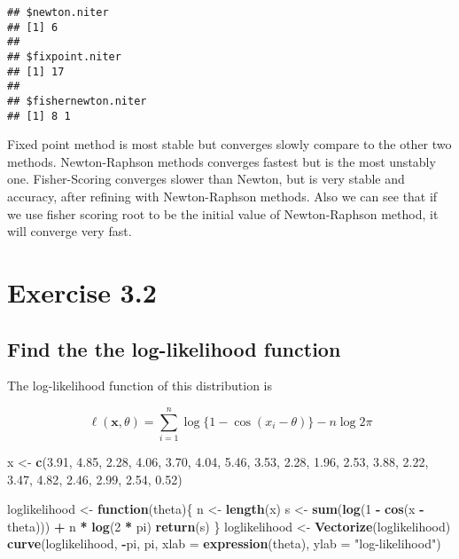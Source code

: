 \documentclass[]{book}
\newenvironment{Shaded}{\begin{snugshade}}{\end{snugshade}}
\newcommand{\KeywordTok}[1]{\textcolor[rgb]{0.13,0.29,0.53}{\textbf{#1}}}
\newcommand{\DataTypeTok}[1]{\textcolor[rgb]{0.13,0.29,0.53}{#1}}
\newcommand{\DecValTok}[1]{\textcolor[rgb]{0.00,0.00,0.81}{#1}}
\newcommand{\FloatTok}[1]{\textcolor[rgb]{0.00,0.00,0.81}{#1}}
\newcommand{\StringTok}[1]{\textcolor[rgb]{0.31,0.60,0.02}{#1}}
\newcommand{\ControlFlowTok}[1]{\textcolor[rgb]{0.13,0.29,0.53}{\textbf{#1}}}
\newcommand{\OperatorTok}[1]{\textcolor[rgb]{0.81,0.36,0.00}{\textbf{#1}}}
\newcommand{\NormalTok}[1]{#1}
\theoremstyle{definition}
\theoremstyle{definition}
\theoremstyle{definition}
\theoremstyle{remark}
\begin{document}
\begin{verbatim}
## $newton.niter
## [1] 6
## 
## $fixpoint.niter
## [1] 17
## 
## $fishernewton.niter
## [1] 8 1
\end{verbatim}

Fixed point method is most stable but converges slowly compare to the
other two methods. Newton-Raphson methods converges fastest but is the
most unstably one. Fisher-Scoring converges slower than Newton, but is
very stable and accuracy, after refining with Newton-Raphson methods.
Also we can see that if we use fisher scoring root to be the initial
value of Newton-Raphson method, it will converge very fast.

\chapter{Exercise 3.2}\label{exercise-3.2}

\section{Find the the log-likelihood
function}\label{find-the-the-log-likelihood-function}

The log-likelihood function of this distribution is

\[ \ell(\mathbf{x}, \theta) = \sum_{i=1}^n \log\{1-\cos(x_i-\theta)\} - n\log2\pi\]

\begin{Shaded}
\begin{Highlighting}[]
\NormalTok{x <-}\StringTok{ }\KeywordTok{c}\NormalTok{(}\FloatTok{3.91}\NormalTok{, }\FloatTok{4.85}\NormalTok{, }\FloatTok{2.28}\NormalTok{, }\FloatTok{4.06}\NormalTok{, }\FloatTok{3.70}\NormalTok{, }\FloatTok{4.04}\NormalTok{, }\FloatTok{5.46}\NormalTok{, }\FloatTok{3.53}\NormalTok{, }\FloatTok{2.28}\NormalTok{, }\FloatTok{1.96}\NormalTok{,}
       \FloatTok{2.53}\NormalTok{, }\FloatTok{3.88}\NormalTok{, }\FloatTok{2.22}\NormalTok{, }\FloatTok{3.47}\NormalTok{, }\FloatTok{4.82}\NormalTok{, }\FloatTok{2.46}\NormalTok{, }\FloatTok{2.99}\NormalTok{, }\FloatTok{2.54}\NormalTok{, }\FloatTok{0.52}\NormalTok{)}

\NormalTok{loglikelihood <-}\StringTok{ }\ControlFlowTok{function}\NormalTok{(theta)\{}
\NormalTok{  n <-}\StringTok{ }\KeywordTok{length}\NormalTok{(x)}
\NormalTok{  s <-}\StringTok{ }\KeywordTok{sum}\NormalTok{(}\KeywordTok{log}\NormalTok{(}\DecValTok{1} \OperatorTok{-}\StringTok{ }\KeywordTok{cos}\NormalTok{(x }\OperatorTok{-}\StringTok{ }\NormalTok{theta))) }\OperatorTok{+}\StringTok{ }\NormalTok{n }\OperatorTok{*}\StringTok{ }\KeywordTok{log}\NormalTok{(}\DecValTok{2} \OperatorTok{*}\StringTok{ }\NormalTok{pi)}
  \KeywordTok{return}\NormalTok{(s)}
\NormalTok{\}}
\NormalTok{loglikelihood <-}\StringTok{ }\KeywordTok{Vectorize}\NormalTok{(loglikelihood)}
\KeywordTok{curve}\NormalTok{(loglikelihood, }\OperatorTok{-}\NormalTok{pi, pi, }\DataTypeTok{xlab =} \KeywordTok{expression}\NormalTok{(theta), }\DataTypeTok{ylab =} \StringTok{"log-likelihood"}\NormalTok{)}
\end{Highlighting}
\end{Shaded}
\end{document}
